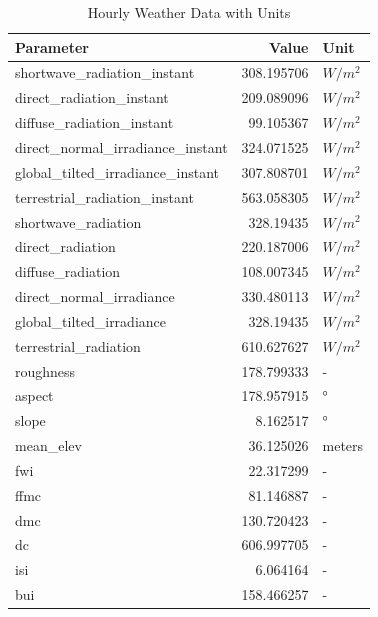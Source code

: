 \begin{table}[H]
	\centering
	\begin{tabular}{lrl}
		\toprule
		Parameter & Value & Unit \\
		\midrule
		shortwave\_radiation\_instant & 308.195706 & $W/m^2$ \\
		direct\_radiation\_instant & 209.089096 & $W/m^2$ \\
		diffuse\_radiation\_instant & 99.105367 & $W/m^2$ \\
		direct\_normal\_irradiance\_instant & 324.071525 & $W/m^2$ \\
		global\_tilted\_irradiance\_instant & 307.808701 & $W/m^2$ \\
		terrestrial\_radiation\_instant & 563.058305 & $W/m^2$ \\
		shortwave\_radiation & 328.19435 & $W/m^2$ \\
		direct\_radiation & 220.187006 & $W/m^2$ \\
		diffuse\_radiation & 108.007345 & $W/m^2$ \\
		direct\_normal\_irradiance & 330.480113 & $W/m^2$ \\
		global\_tilted\_irradiance & 328.19435 & $W/m^2$ \\
		terrestrial\_radiation & 610.627627 & $W/m^2$ \\
		roughness & 178.799333 & - \\
		aspect & 178.957915 & ° \\
		slope & 8.162517 & ° \\
		mean\_elev & 36.125026 & meters \\
		fwi & 22.317299 & - \\
		ffmc & 81.146887 & - \\
		dmc & 130.720423 & - \\
		dc & 606.997705 & - \\
		isi & 6.064164 & - \\
		bui & 158.466257 & - \\
		\bottomrule
	\end{tabular}
	\caption{Hourly Weather Data with Units}
	\label{tab:hourly_weather_data_units}
\end{table}






